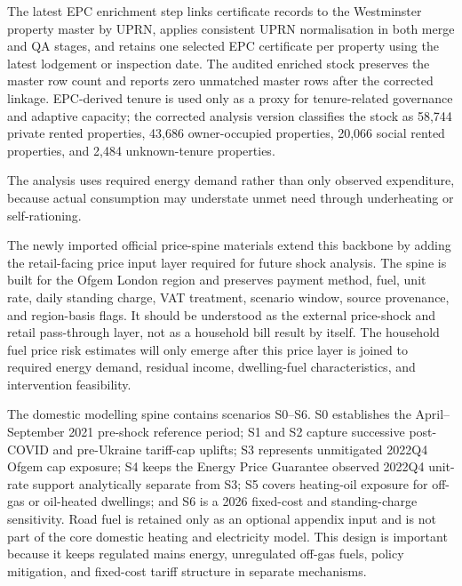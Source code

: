 The latest EPC enrichment step links certificate records to the Westminster property master by UPRN, applies consistent UPRN normalisation in both merge and QA stages, and retains one selected EPC certificate per property using the latest lodgement or inspection date. The audited enriched stock preserves the master row count and reports zero unmatched master rows after the corrected linkage. EPC-derived tenure is used only as a proxy for tenure-related governance and adaptive capacity; the corrected analysis version classifies the stock as 58,744 private rented properties, 43,686 owner-occupied properties, 20,066 social rented properties, and 2,484 unknown-tenure properties.

The analysis uses required energy demand rather than only observed expenditure, because actual consumption may understate unmet need through underheating or self-rationing.

The newly imported official price-spine materials extend this backbone by adding the retail-facing price input layer required for future shock analysis. The spine is built for the Ofgem London region and preserves payment method, fuel, unit rate, daily standing charge, VAT treatment, scenario window, source provenance, and region-basis flags. It should be understood as the external price-shock and retail pass-through layer, not as a household bill result by itself. The household fuel price risk estimates will only emerge after this price layer is joined to required energy demand, residual income, dwelling-fuel characteristics, and intervention feasibility.

The domestic modelling spine contains scenarios S0--S6. S0 establishes the April--September 2021 pre-shock reference period; S1 and S2 capture successive post-COVID and pre-Ukraine tariff-cap uplifts; S3 represents unmitigated 2022Q4 Ofgem cap exposure; S4 keeps the Energy Price Guarantee observed 2022Q4 unit-rate support analytically separate from S3; S5 covers heating-oil exposure for off-gas or oil-heated dwellings; and S6 is a 2026 fixed-cost and standing-charge sensitivity. Road fuel is retained only as an optional appendix input and is not part of the core domestic heating and electricity model. This design is important because it keeps regulated mains energy, unregulated off-gas fuels, policy mitigation, and fixed-cost tariff structure in separate mechanisms.

